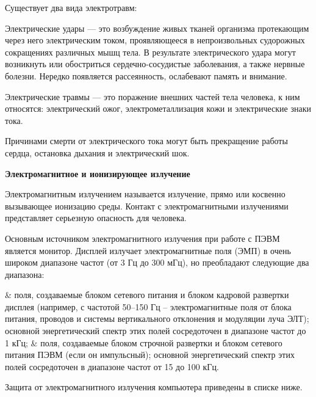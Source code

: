 Существует два вида электротравм:

Электрические удары --- это возбуждение живых тканей организма протекающим через него электрическим током, проявляющееся в непроизвольных судорожных сокращениях различных мышц тела.
В результате электрического удара могут возникнуть или обостриться сердечно-сосудистые заболевания, а также нервные болезни.
Нередко появляется рассеянность, ослабевают память и внимание.

Электрические травмы --- это поражение внешних частей тела человека, к ним относятся: электрический ожог, электрометаллизация кожи и электрические знаки тока.

Причинами смерти от электрического тока могут быть прекращение работы сердца, остановка дыхания и электрический шок.

\textbf{\point Электромагнитное и ионизирующее излучение}

Электромагнитным излучением называется излучение, прямо или косвенно вызывающее ионизацию среды.
Контакт с электромагнитными излучениями представляет серьезную опасность для человека.

Основным источником электромагнитного излучения при работе с ПЭВМ является монитор.
Дисплей излучает электромагнитные поля (ЭМП) в очень широком диапазоне частот (от 3 Гц до 300 мГц), но преобладают следующие два диапазона:

\begin{easylist}
& поля, создаваемые блоком сетевого питания и блоком кадровой развертки дисплея (например, с частотой 50–150 Гц – электромагнитные поля от блока питания, проводов и системы вертикального отклонения и модуляции луча ЭЛТ); основной энергетический спектр этих полей сосредоточен в диапазоне частот до 1 кГц;
& поля, создаваемые блоком строчной развертки и блоком сетевого питания ПЭВМ (если он импульсный); основной энергетический спектр этих полей сосредоточен в диапазоне частот от 15 до 100 кГц.
\end{easylist}

Защита от электромагнитного излучения компьютера приведены в списке ниже.

